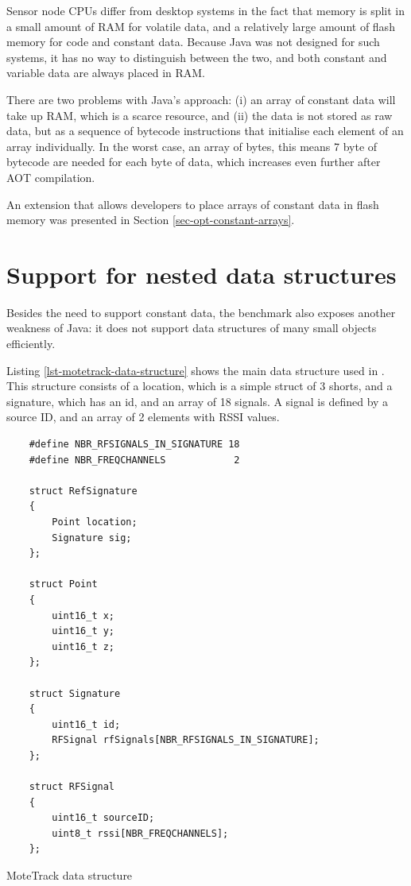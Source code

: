 Sensor node CPUs differ from desktop systems in the fact that memory is split in a small amount of RAM for volatile data, and a relatively large amount of flash memory for code and constant data. Because Java was not designed for such systems, it has no way to distinguish between the two, and both constant and variable data are always placed in RAM.

There are two problems with Java's approach: (i) an array of constant data will take up RAM, which is a scarce resource, and (ii) the data is not stored as raw data, but as a sequence of bytecode instructions that initialise each element of an array individually. In the worst case, an array of bytes, this means 7 byte of bytecode are needed for each byte of data, which increases even further after AOT compilation.

An extension that allows developers to place arrays of constant data in flash memory was presented in Section \ref{sec-opt-constant-arrays}.




\section{Support for nested data structures}
\label{sec-nested-data}
Besides the need to support constant data, the  benchmark also exposes another weakness of Java: it does not support data structures of many small objects efficiently.

Listing \ref{lst-motetrack-data-structure} shows the main  data structure used in . This structure consists of a location, which is a simple struct of 3 shorts, and a signature, which has an id, and an array of 18 signals. A signal is defined by a source ID, and an array of 2 elements with RSSI values.

\begin{listing}
\begin{verbatim}
    #define NBR_RFSIGNALS_IN_SIGNATURE 18
    #define NBR_FREQCHANNELS            2

    struct RefSignature
    {
        Point location;
        Signature sig;
    };

    struct Point
    {
        uint16_t x;
        uint16_t y;
        uint16_t z;
    };

    struct Signature
    {
        uint16_t id;
        RFSignal rfSignals[NBR_RFSIGNALS_IN_SIGNATURE];
    };

    struct RFSignal
    {
        uint16_t sourceID;
        uint8_t rssi[NBR_FREQCHANNELS];
    };
\end{verbatim}
\caption{MoteTrack  data structure}
\label{lst-motetrack-data-structure}
\end{listing}

